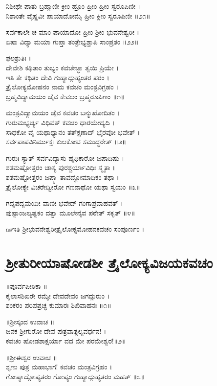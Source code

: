 ನಿಶೀಥೇ ಪಾತು ಬ್ರಹ್ಮಾಣೀ ಕ್ರೀಂ ಹ್ರೂಂ ಹ್ರೀಂ ಹ್ರೀಂ ಸ್ವರೂಪಿಣೀ ।\\
ನಿಶಾಂತೇ ವೈಷ್ಣವೀ ಪಾಯಾದೋಮೈ ಹ್ರೀಂ ಕ್ಲೀಂ ಸ್ವರೂಪಿಣೀ ॥೨೧॥

ಸರ್ವಕಾಲೇ ಚ ಮಾಂ ಪಾಯಾದೋ ಹ್ರೀಂ ಶ್ರೀಂ ಭುವನೇಶ್ವರೀ ।\\
ಏಷಾ ವಿದ್ಯಾ ಮಯಾ ಗುಪ್ತಾ ತಂತ್ರೇಭ್ಯಶ್ಚಾಪಿ ಸಾಂಪ್ರತಂ ॥೨೨॥

ಫಲಶ್ರುತಿಃ ।\\
ದೇವೇಶಿ ಕಥಿತಾಂ ತುಭ್ಯಂ ಕವಚೇಚ್ಛಾ ತ್ವಯಿ ಪ್ರಿಯೇ ।\\
ಇತಿ ತೇ ಕಥಿತಂ ದೇವಿ ಗುಹ್ಯಾದ್ಗುಹ್ಯಂತರ ಪರಂ ।\\
ತ್ರೈಲೋಕ್ಯಮೋಹನಂ ನಾಮ ಕವಚಂ ಮಂತ್ರವಿಗ್ರಹಂ ।\\
ಬ್ರಹ್ಮವಿದ್ಯಾಮಯಂ ಚೈವ ಕೇವಲಂ ಬ್ರಹ್ಮರೂಪಿಣಂ ॥೧॥

ಮಂತ್ರವಿದ್ಯಾಮಯಂ ಚೈವ ಕವಚಂ ಬನ್ಮುಖೋದಿತಂ ।\\
ಗುರುಮಭ್ಯರ್ಚ್ಯ ವಿಧಿವತ್ ಕವಚಂ ಧಾರಯೇದ್ಯದಿ ।\\
ಸಾಧಕೋ ವೈ ಯಥಾಧ್ಯಾನಂ ತತ್ಕ್ಷಣಾದ್ ಭೈರವೋ ಭವೇತ್ ।\\
ಸರ್ವಪಾಪವಿನಿರ್ಮುಕ್ತಃ ಕುಲಕೋಟಿ ಸಮುದ್ಧರೇತ್ ॥೨॥

ಗುರುಃ ಸ್ಯಾತ್ ಸರ್ವವಿದ್ಯಾಸು ಹ್ಯಧಿಕಾರೋ ಜಪಾದಿಷು ।\\
ಶತಮಷ್ಟೋತ್ತರಂ ಚಾಸ್ಯ ಪುರಶ್ಚರ್ಯಾವಿಧಿಃ ಸ್ಮೃತಾ ।\\
ಶತಮಷ್ಟೋತ್ತರಂ ಜಪ್ತ್ವಾ ತಾವದ್ಧೋಮಾದಿಕಂ ತಥಾ ।\\
ತ್ರೈಲೋಕ್ಯೇ ವಿಚರೇದ್ವೀರೋ ಗಣನಾಥೋ ಯಥಾ ಸ್ವಯಂ ॥೩॥

ಗದ್ಯಪದ್ಯಮಯೀ ವಾಣೀ ಭವೇದ್ ಗಂಗಾಪ್ರವಾಹವತ್ ।\\
ಪುಷ್ಪಾಂಜಲ್ಯಷ್ಟಕಂ ದತ್ವಾ ಮೂಲೇನೈವ ಪಠೇತ್ ಸಕೃತ್ ॥೪॥

asಇತಿ ಶ್ರೀಭುವನೇಶ್ವರೀತ್ರೈಲೋಕ್ಯಮೋಹನಕವಚಂ ಸಂಪೂರ್ಣಂ ।\\
\section{ಶ್ರೀತುರೀಯಾಷೋಡಶೀ ತ್ರೈಲೋಕ್ಯವಿಜಯಕವಚಂ}
॥ಪೂರ್ವಪೀಠಿಕಾ ॥\\
ಕೈಲಾಸಶಿಖರೇ ರಮ್ಯೇ ದೇವದೇವಂ ಜಗದ್ಗುರುಂ ।\\
ಶಂಕರಂ ಪರಿಪಪ್ರಚ್ಛ ಕುಮಾರಃ ಶಿಖಿವಾಹನಃ ॥೧॥

॥ಶ್ರೀಸ್ಕಂದ ಉವಾಚ ॥\\
ಜನಕ ಶ್ರೀಗುರೋ ದೇವ ಪುತ್ರವಾತ್ಸಲ್ಯವರ್ಧನ! ।\\
ಕವಚಂ ಷೋಡಶಾಕ್ಷರ್ಯಾ ವದ ಮೇ ಪರಮೇಶ್ವರ!॥೨॥

॥ಶ್ರೀಈಶ್ವರ ಉವಾಚ ॥\\
ಶೃಣು ಪುತ್ರ ಮಹಾಭಾಗ! ಕವಚಂ ಮಂತ್ರವಿಗ್ರಹಂ ।\\
ಗೋಪ್ಯಾದ್ಗೋಪ್ಯತರಂ ಗೋಪ್ಯಂ ಗುಹ್ಯಾದ್ಗುಹ್ಯತರಂ ಮಹತ್ ॥೩॥

